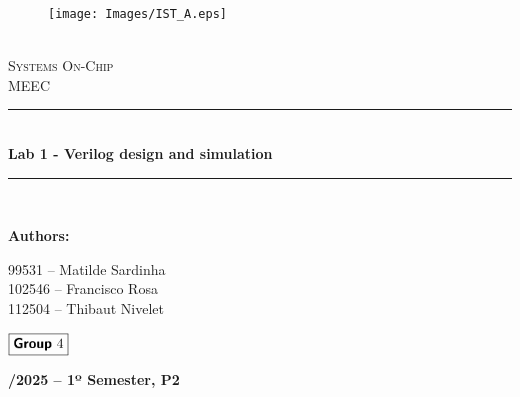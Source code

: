 \documentclass[12pt]{article}
\newcommand{\HRule}{\rule{\linewidth}{0.5mm}} %
\begin{document}
\begin{center}
    \begin{figure}
        \vspace{-1.0cm}
        \texttt{[image: Images/IST\_A.eps]} %
    \end{figure}
       \mbox{}\\[2.0cm]
    \textsc{\Huge  Systems On-Chip}\\[2.5cm]
    \textsc{\LARGE MEEC}\\[2.0cm]
    \HRule\\[0.4cm]
    {\large \bf {\selectfont Lab 1 - Verilog design and simulation}}\\[0.2cm]
    \HRule\\[1.5cm]
\end{center}

\begin{flushleft}
    \textbf{\selectfont Authors:}
\end{flushleft}

\begin{center}
    \begin{minipage}{0.5\textwidth}
        \begin{flushleft}
            99531 – Matilde Sardinha \\
            102546 – Francisco Rosa \\
            112504 – Thibaut Nivelet
        \end{flushleft}
    \end{minipage}%
\end{center}
    
\begin{flushleft}
    \large $\boxed{\text{\bf \fontfamily{cmss}\selectfont Group} \ 4}$\\[1.0cm]
\end{flushleft}


  
\begin{center}
    \large \bf {}/2025 -- 1º Semester, P2
\end{center}

\thispagestyle{empty}

\setcounter{page}{0}

\newpage


\end{document}
